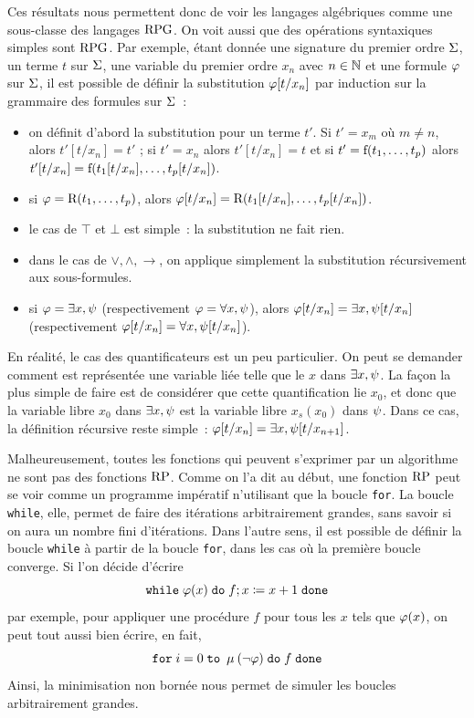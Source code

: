 Ces résultats nous permettent donc de voir les langages algébriques comme une
sous-classe des langages $\operatorname{RPG}$. On voit aussi que des opérations syntaxiques
simples sont $\operatorname{RPG}$. Par exemple, étant donnée une signature du premier ordre
$\Sigma$, un terme $t$ sur $\Sigma$, une variable du premier ordre $x_n$ avec
$n \in \mathbb N$ et une formule $\varphi$ sur $\Sigma$, il est possible de définir la
substitution $\varphi[t/x_n]$ par induction sur la grammaire des formules sur
$\Sigma$~:
\begin{itemize}
\item on définit d'abord la substitution pour un terme $t'$. Si $t' = x_m$ où
  $m \neq n$, alors $t'[t/x_n] = t'$ ; si $t' = x_n$ alors $t'[t/x_n] = t$ et
  si $t' = \mathrm{f}(t_1,\ldots,t_p)$ alors
  $t'[t/x_n]=\mathrm{f}(t_1[t/x_n],\ldots,t_p[t/x_n])$.
\item si $\varphi = \mathrm{R}(t_1,\ldots,t_p)$, alors
  $\varphi[t/x_n]=\mathrm{R}(t_1[t/x_n],\ldots,t_p[t/x_n])$.
\item le cas de $\top$ et $\bot$ est simple~: la substitution ne fait rien.
\item dans le cas de $\lor,\land,\to$, on applique simplement la substitution
  récursivement aux sous-formules.
\item si $\varphi = \exists x,\psi$ (respectivement $\varphi=\forall x,\psi$),
  alors $\varphi[t/x_n] = \exists x, \psi[t/x_n]$
  (respectivement $\varphi[t/x_n] = \forall x, \psi[t/x_n]$).
\end{itemize}

En réalité, le cas des quantificateurs est un peu particulier. On peut se
demander comment est représentée une variable liée telle que le $x$ dans
$\exists x, \psi$. La façon la plus simple de faire est de considérer que
cette quantification lie $x_0$, et donc que la variable libre $x_0$ dans
$\exists x, \psi$ est la variable libre $x_s(x_0)$ dans $\psi$. Dans ce cas,
la définition récursive reste simple~:
$\varphi[t/x_n] = \exists x, \psi[t/x_{n+1}]$.

Malheureusement, toutes les fonctions qui peuvent s'exprimer par un algorithme
ne sont pas des fonctions $\operatorname{RP}$. Comme on l'a dit au début, une fonction
$\operatorname{RP}$ peut se voir comme un programme impératif n'utilisant que la boucle
\texttt{for}. La boucle \texttt{while}, elle, permet de faire des itérations
arbitrairement grandes, sans savoir  si on aura un nombre
fini d'itérations. Dans l'autre sens, il est possible de définir la boucle
\texttt{while} à partir de la boucle \texttt{for}, dans les cas où la première
boucle converge. Si l'on décide d'écrire
\[\texttt{while}\;\varphi(x) \;\texttt{do}\; f ; x \coloneq x + 1\;
\texttt{done}\]
par exemple, pour appliquer une procédure $f$ pour tous les $x$ tels que
$\varphi(x)$, on peut tout aussi bien écrire, en fait,
\[\texttt{for}\; i = 0 \;\texttt{to}\; \mathbin{\mu}(\lnot \varphi)\;\texttt{do}\; f\;
\texttt{done}\]
Ainsi, la minimisation non bornée nous permet de simuler les boucles
arbitrairement grandes.

